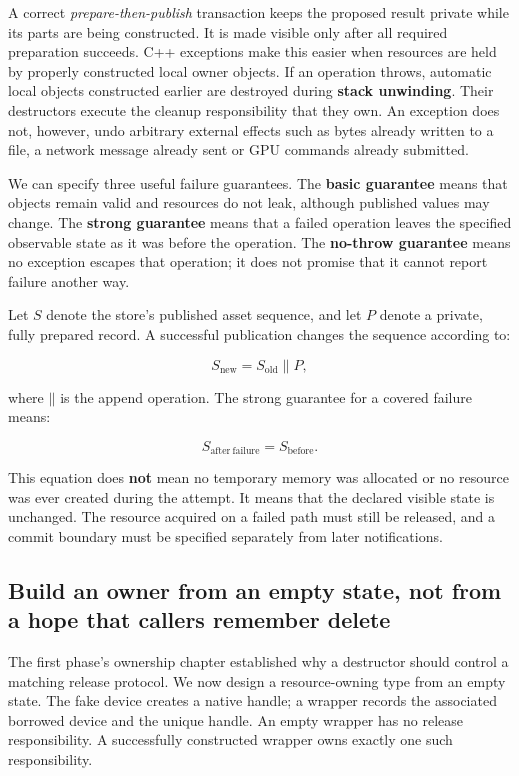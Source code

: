 A correct \emph{prepare-then-publish} transaction keeps the proposed result private while its parts are being constructed. It is made visible only after all required preparation succeeds. C++ exceptions make this easier when resources are held by properly constructed local owner objects. If an operation throws, automatic local objects constructed earlier are destroyed during \textbf{stack unwinding}. Their destructors execute the cleanup responsibility that they own. An exception does not, however, undo arbitrary external effects such as bytes already written to a file, a network message already sent or GPU commands already submitted.

We can specify three useful failure guarantees. The \textbf{basic guarantee} means that objects remain valid and resources do not leak, although published values may change. The \textbf{strong guarantee} means that a failed operation leaves the specified observable state as it was before the operation. The \textbf{no-throw guarantee} means no exception escapes that operation; it does not promise that it cannot report failure another way.

Let \(S\) denote the store's published asset sequence, and let \(P\) denote a private, fully prepared record. A successful publication changes the sequence according to:

\[
S_{\mathrm{new}} = S_{\mathrm{old}} \mathbin{\|} P,
\]

where \(\mathbin{\|}\) is the append operation. The strong guarantee for a covered failure means:

\[
S_{\mathrm{after\ failure}} = S_{\mathrm{before}}.
\]

This equation does \textbf{not} mean no temporary memory was allocated or no resource was ever created during the attempt. It means that the declared visible state is unchanged. The resource acquired on a failed path must still be released, and a commit boundary must be specified separately from later notifications.

\subsection{Build an owner from an empty state, not from a hope that callers remember delete}\label{01-foundations-i-ch004-build-an-owner-from-an-empty-state-not-from-a-hope-that-callers-remember-delete}

The first phase's ownership chapter established why a destructor should control a matching release protocol. We now design a resource-owning type from an empty state. The fake device creates a native handle; a wrapper records the associated borrowed device and the unique handle. An empty wrapper has no release responsibility. A successfully constructed wrapper owns exactly one such responsibility.

